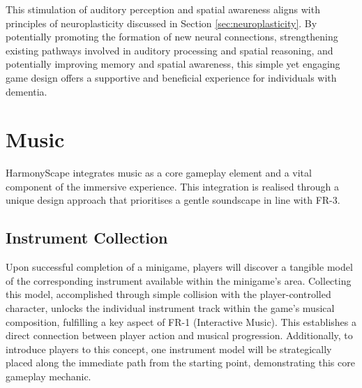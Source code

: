 \documentclass{l4proj}
\begin{document}
This stimulation of auditory perception and spatial awareness aligns with principles of neuroplasticity discussed in Section \ref{sec:neuroplasticity}. By potentially promoting the formation of new neural connections, strengthening existing pathways involved in auditory processing and spatial reasoning, and potentially improving memory and spatial awareness, this simple yet engaging game design offers a supportive and beneficial experience for individuals with dementia.

\section{Music}
HarmonyScape integrates music as a core gameplay element and a vital component of the immersive experience. This integration is realised through a unique design approach that prioritises a gentle soundscape in line with FR-3.

\subsection{Instrument Collection}
Upon successful completion of a minigame, players will discover a tangible model of the corresponding instrument available within the minigame's area. Collecting this model, accomplished through simple collision with the player-controlled character, unlocks the individual instrument track within the game's musical composition, fulfilling a key aspect of FR-1 (Interactive Music). This establishes a direct connection between player action and musical progression. Additionally, to introduce players to this concept, one instrument model will be strategically placed along the immediate path from the starting point, demonstrating this core gameplay mechanic.
\end{document}
